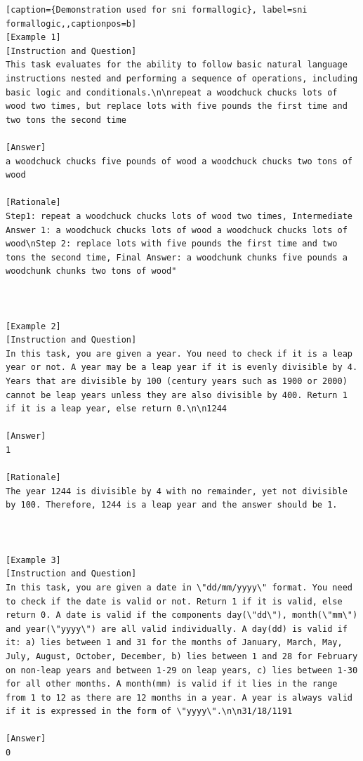     




\begin{lstlisting}[caption={Demonstration used for sni formallogic}, label=sni formallogic,,captionpos=b]
[Example 1]
[Instruction and Question]
This task evaluates for the ability to follow basic natural language instructions nested and performing a sequence of operations, including basic logic and conditionals.\n\nrepeat a woodchuck chucks lots of wood two times, but replace lots with five pounds the first time and two tons the second time

[Answer]
a woodchuck chucks five pounds of wood a woodchuck chucks two tons of wood

[Rationale]
Step1: repeat a woodchuck chucks lots of wood two times, Intermediate Answer 1: a woodchuck chucks lots of wood a woodchuck chucks lots of wood\nStep 2: replace lots with five pounds the first time and two tons the second time, Final Answer: a woodchunk chunks five pounds a woodchunk chunks two tons of wood"



[Example 2]
[Instruction and Question]
In this task, you are given a year. You need to check if it is a leap year or not. A year may be a leap year if it is evenly divisible by 4. Years that are divisible by 100 (century years such as 1900 or 2000) cannot be leap years unless they are also divisible by 400. Return 1 if it is a leap year, else return 0.\n\n1244

[Answer]
1

[Rationale]
The year 1244 is divisible by 4 with no remainder, yet not divisible by 100. Therefore, 1244 is a leap year and the answer should be 1.



[Example 3]
[Instruction and Question]
In this task, you are given a date in \"dd/mm/yyyy\" format. You need to check if the date is valid or not. Return 1 if it is valid, else return 0. A date is valid if the components day(\"dd\"), month(\"mm\") and year(\"yyyy\") are all valid individually. A day(dd) is valid if it: a) lies between 1 and 31 for the months of January, March, May, July, August, October, December, b) lies between 1 and 28 for February on non-leap years and between 1-29 on leap years, c) lies between 1-30 for all other months. A month(mm) is valid if it lies in the range from 1 to 12 as there are 12 months in a year. A year is always valid if it is expressed in the form of \"yyyy\".\n\n31/18/1191

[Answer]
0


\end{lstlisting}
